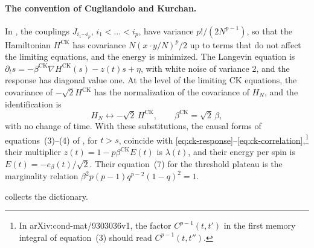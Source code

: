 \paragraph{The convention of Cugliandolo and Kurchan.}
In \cite[Equations~(1)--(4)]{ck1993}, the couplings $J_{i_1\cdots i_p}$, $i_1<\dots<i_p$, have variance $p!/(2N^{p-1})$, so that the Hamiltonian $H^{\mathrm{CK}}$ has covariance $N(x\cdot y/N)^p/2$ up to terms that do not affect the limiting equations, and the energy is minimized. The Langevin equation is $\partial_ts=-\beta^{\mathrm{CK}}\nabla H^{\mathrm{CK}}(s)-z(t)s+\eta$, with white noise of variance $2$, and the response has diagonal value one. At the level of the limiting CK equations, the covariance of $-\sqrt2H^{\mathrm{CK}}$ has the normalization of the covariance of $H_N$, and the identification is
\[
 H_N\leftrightarrow-\sqrt2\,H^{\mathrm{CK}},\qquad
 \beta^{\mathrm{CK}}=\sqrt2\,\beta,
\]
with no change of time. With these substitutions, the causal forms of equations~(3)--(4) of \cite{ck1993}, for $t>s$, coincide with \eqref{eq:ck-response}--\eqref{eq:ck-correlation},\footnote{In arXiv:cond-mat/9303036v1, the factor $C^{p-1}(t,t')$ in the first memory integral of equation~(3) should read $C^{p-1}(t,t'')$.} their multiplier $z(t)=1-p\beta^{\mathrm{CK}}E(t)$ is $\lambda(t)$, and their energy per spin is $E(t)=-e_\beta(t)/\sqrt2$. Their equation~(7) for the threshold plateau is the marginality relation $\beta^2p(p-1)q^{p-2}(1-q)^2=1$.

 collects the dictionary.

